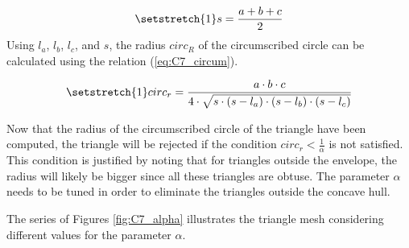 \begin{equation}
    \setstretch{1}
    s = \frac{a + b + c}{2}\label{eq:C7_semiperim}
\end{equation}
Using $l_a$, $l_b$, $l_c$, and $s$, the radius $circ_R$ of the circumscribed circle can be calculated using the relation (\ref{eq:C7_circum}). 

\begin{equation}
    \setstretch{1}
   circ_r = \frac{a\cdot b\cdot c}{4\cdot \sqrt{s\cdot (s - l_a)\cdot (s - l_b)\cdot (s - l_c)}}\label{eq:C7_circum}
\end{equation}

Now that the radius of the circumscribed circle of the triangle have been computed, the triangle will be rejected if the condition $circ_r <\frac{1}{\alpha}$ is not satisfied. This condition is justified by noting that for triangles outside the envelope, the radius will likely be bigger since all these triangles are obtuse. The parameter $\alpha$ needs to be tuned in order to eliminate the triangles outside the concave hull. 

The series of Figures \ref{fig:C7_alpha} illustrates the triangle mesh considering different values for the parameter $\alpha$.

